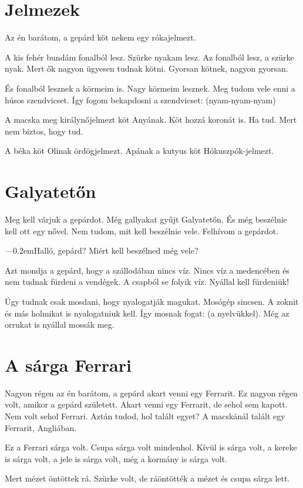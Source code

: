 \documentclass[12pt]{memoir}
\def\dash{---\kern 0.2em}
\begin{document}
\section{Jelmezek}
Az én barátom, a gepárd köt nekem egy rókajelmezt.

A kis fehér bundám fonalból lesz. Szürke nyakam lesz. Az fonalból lesz, a
szürke nyak. Mert ők nagyon ügyesen tudnak kötni. Gyorsan kötnek, nagyon
gyorsan.

És fonalból lesznek a körmeim is. Nagy körmeim lesznek. Meg tudom vele enni a
húsos szendvicset. Így fogom bekapdosni a szendvicset: (nyam-nyam-nyam)

A macska meg királynőjelmezt köt Anyának. Köt hozzá koronát is. Ha tud. Mert
nem biztos, hogy tud.

A béka köt Olinak ördögjelmezt. Apának a kutyus köt Hókuszpók-jelmezt.


\section{Galyatetőn}
Meg kell várjuk a gepárdot. Még gallyakat gyűjt Galyatetőn. És még beszélnie
kell ott egy nővel. Nem tudom, mit kell beszélnie vele. Felhívom a gepárdot.

\dash Halló, gepárd? Miért kell beszélned még vele?

Azt mondja a gepárd, hogy a szállodában nincs víz. Nincs víz a medencében és
nem tudnak fürdeni a vendégek. A csapból se folyik víz. Nyállal kell fürdeniük!

Úgy tudnak csak mosdani, hogy nyalogatják magukat. Mosógép sincsen. A zoknit és
más holmikat is nyalogatniuk kell. Így mosnak fogat: (a nyelvükkel). Még az
orrukat is nyállal mossák meg.


\section{A sárga Ferrari}
Nagyon régen az én barátom, a gepárd akart venni egy Ferrarit. Ez nagyon régen
volt, amikor a gepárd született. Akart venni egy Ferrarit, de sehol sem kapott.
Nem volt sehol Ferrari. Aztán tudod, hol talált egyet? A macskánál talált egy
Ferrarit, Angliában.

Ez a Ferrari sárga volt. Csupa sárga volt mindenhol. Kívül is sárga volt, a
kereke is sárga volt, a jele is sárga volt, még a kormány is sárga volt.

Mert mézet öntöttek rá. Szürke volt, de ráöntötték a mézet és csupa sárga lett.
\end{document}
